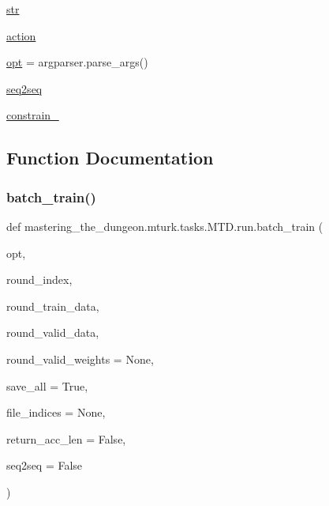 \begin{DoxyCompactItemize}
\item 
\hyperlink{namespacemastering__the__dungeon_1_1mturk_1_1tasks_1_1MTD_1_1run_a0cc39d8c6949f1abfe3f53d3c9530789}{str}
\item 
\hyperlink{namespacemastering__the__dungeon_1_1mturk_1_1tasks_1_1MTD_1_1run_aca0141fea057b26864a487c54763d92c}{action}
\item 
\hyperlink{namespacemastering__the__dungeon_1_1mturk_1_1tasks_1_1MTD_1_1run_a637b31bdf145203e9426ad66a6513f2a}{opt} = argparser.\+parse\+\_\+args()
\item 
\hyperlink{namespacemastering__the__dungeon_1_1mturk_1_1tasks_1_1MTD_1_1run_a75b170de6a584daf5d0d550aa9c1ad60}{seq2seq}
\item 
\hyperlink{namespacemastering__the__dungeon_1_1mturk_1_1tasks_1_1MTD_1_1run_ae8748f02442b37b0398c1b0bd3533894}{constrain\+\_\+}
\end{DoxyCompactItemize}


\subsection{Function Documentation}
\mbox{\label{namespacemastering__the__dungeon_1_1mturk_1_1tasks_1_1MTD_1_1run_a5446e6439831de9f1fd7b8a2b86fad6b}} 
\subsubsection{\texorpdfstring{batch\+\_\+train()}{batch\_train()}}
{\footnotesize\ttfamily def mastering\+\_\+the\+\_\+dungeon.\+mturk.\+tasks.\+M\+T\+D.\+run.\+batch\+\_\+train (\begin{DoxyParamCaption}\item[{}]{opt,  }\item[{}]{round\+\_\+index,  }\item[{}]{round\+\_\+train\+\_\+data,  }\item[{}]{round\+\_\+valid\+\_\+data,  }\item[{}]{round\+\_\+valid\+\_\+weights = {\ttfamily None},  }\item[{}]{save\+\_\+all = {\ttfamily True},  }\item[{}]{file\+\_\+indices = {\ttfamily None},  }\item[{}]{return\+\_\+acc\+\_\+len = {\ttfamily False},  }\item[{}]{seq2seq = {\ttfamily False} }\end{DoxyParamCaption})}



